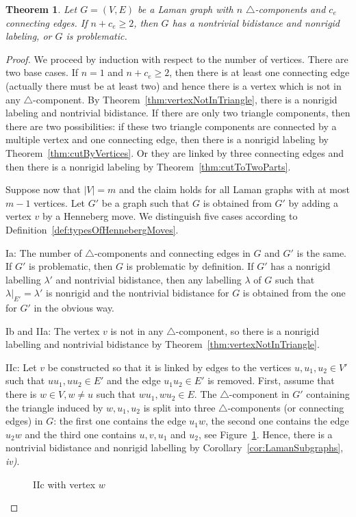 \documentclass[a4paper, 11pt]{article}
\newcommand{\trcomp}{$\triangle$-component}
\newcommand{\trcomps}{$\triangle$-components}
\newtheorem{thm}{Theorem}[section]
\theoremstyle{definition}
\begin{document}
\begin{thm}
Let $G=(V,E)$ be a Laman graph with $n$ \trcomps{} and $c_e$ connecting edges. If $n+c_e\geq 2$, then $G$ has a nontrivial bidistance and nonrigid labeling, or $G$ is problematic.
\end{thm}
\begin{proof}
We proceed by induction with respect to the number of vertices. There are two base cases. If $n=1$ and $n+c_e\geq 2$, then there is at least one connecting edge (actually there must be at least two) and hence there is a vertex which is not in any \trcomp{}. By Theorem~\ref{thm:vertexNotInTriangle}, there is a nonrigid labeling and nontrivial bidistance.
If there are only two triangle components, then there are two possibilities: if these two triangle components are connected by a multiple vertex and one connecting edge, then there is a nonrigid labeling by Theorem~\ref{thm:cutByVertices}. Or they are linked by three connecting edges and then there is a nonrigid labeling by Theorem~\ref{thm:cutToTwoParts}.

Suppose now that $|V|=m$ and the claim holds for all Laman graphs with at most $m-1$ vertices. Let $G'$ be a graph such that $G$ is obtained from $G'$ by adding a vertex $v$ by a Henneberg move. We distinguish five cases according to Definition~\ref{def:typesOfHennebergMoves}.

Ia: The number of \trcomps{} and connecting edges in $G$ and $G'$ is the same. If $G'$ is problematic, then $G$ is problematic by definition. If $G'$ has a nonrigid labelling $\lambda'$ and nontrivial bidistance, then any labelling $\lambda$ of $G$ such that $\lambda|_{E'}=\lambda'$ is nonrigid and the nontrivial bidistance for $G$ is obtained from the one for $G'$ in the obvious way.

Ib and IIa: The vertex $v$ is not in any \trcomp{}, so there is a nonrigid labelling and nontrivial bidistance by Theorem~\ref{thm:vertexNotInTriangle}.

IIc: Let $v$ be constructed so that it is linked by edges to the vertices $u,u_1,u_2 \in V'$ such that $uu_1,uu_2\in E'$ and the edge $u_1u_2\in E'$ is removed. First, assume that there is $w\in V, w\neq u$ such that $wu_1,wu_2\in E$. The \trcomp{} in $G'$ containing the triangle induced by $w, u_1, u_2$ is split into three \trcomps{} (or connecting edges) in $G$: the first one contains the edge $u_1w$, the second one contains the edge $u_2w$ and the third one contains $u,v,u_1$ and $u_2$, see Figure~\ref{fig:IIcWithothervertex}. Hence, there is a nontrivial bidistance and nonrigid labelling by Corollary~\ref{cor:LamanSubgraphs}, \textit{iv)}.
\begin{figure}[htb!]
\centering

\caption{IIc with vertex $w$}
\label{fig:IIcWithothervertex}
\end{figure}


\end{proof}
\end{document}
